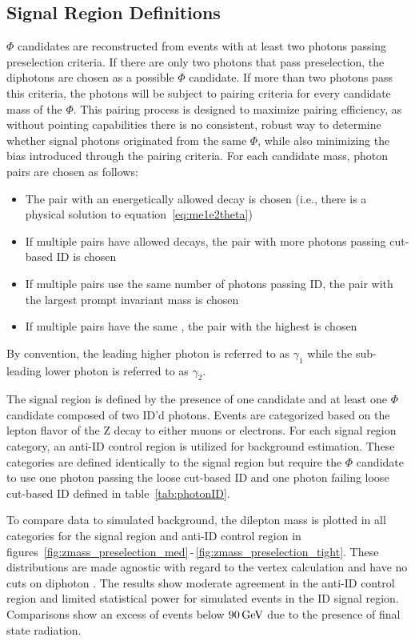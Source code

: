 \subsection{Signal Region Definitions} \label{sec:ana_signalregion}
$\Phi$ candidates are reconstructed from events with at least two photons passing preselection criteria. If there are only two photons that pass preselection, the diphotons are chosen as a possible $\Phi$ candidate. If more than two photons pass this criteria, the photons will be subject to pairing criteria for every candidate mass of the $\Phi$. This pairing process is designed to maximize pairing efficiency, as without pointing capabilities there is no consistent, robust way to determine whether signal photons originated from the same $\Phi$, while also minimizing the bias introduced through the pairing criteria. For each candidate mass, photon pairs are chosen as follows:
\begin{itemize}
	\item The pair with an energetically allowed decay is chosen (i.e., there is a physical solution to equation~\ref{eq:me1e2theta})
	\item If multiple pairs have allowed decays, the pair with more photons passing cut-based ID is chosen
	\item If multiple pairs use the same number of photons passing ID, the pair with the largest prompt invariant mass \mgg is chosen
	\item If multiple pairs have the same \mgg, the pair with the highest \ptgg is chosen
\end{itemize}
By convention, the leading higher \pt photon is referred to as $\gamma_1$ while the sub-leading lower \pt photon is referred to as $\gamma_2$.

The signal region is defined by the presence of one \PZ candidate and at least one $\Phi$ candidate composed of two ID'd photons. Events are categorized based on the lepton flavor of the Z decay to either muons or electrons. For each signal region category, an anti-ID control region is utilized for background estimation. These categories are defined identically to the signal region but require the $\Phi$ candidate to use one photon passing the loose cut-based ID and one photon failing loose cut-based ID defined in table~\ref{tab:photonID}.

To compare data to simulated background, the dilepton mass \mll is plotted in all categories for the signal region and anti-ID control region in figures~\ref{fig:zmass_preselection_med}$\,$-$\,$\ref{fig:zmass_preselection_tight}. These distributions are made agnostic with regard to the vertex calculation and have no cuts on diphoton \lxy. The results show moderate agreement in the anti-ID control region and limited statistical power for simulated events in the ID signal region. Comparisons show an excess of events below $90\,\text{Ge\hspace{-.08em}V}$ due to the presence of final state radiation.

